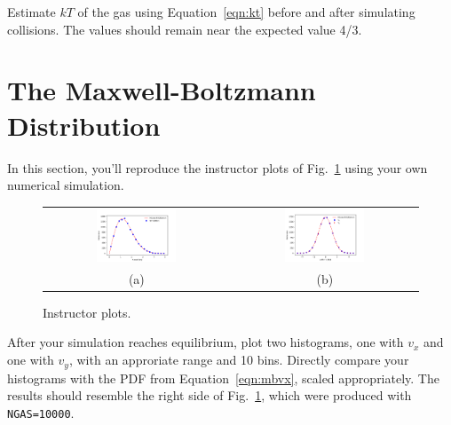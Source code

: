 {\plot Estimate $kT$ of the gas using Equation~\ref{eqn:kt} before and after simulating collisions.
The values should remain near the expected value 4/3.


\section{The Maxwell-Boltzmann Distribution}
\label{sec:mbdist}


In this section, you'll reproduce the instructor plots of
Fig.~\ref{fig:mbinst} using your own numerical simulation.\\

\begin{figure}[htbp]
\begin{center}
  \begin{tabular}{cc}   
  \includegraphics[width=0.45\textwidth]{figs/maxwellboltzman/mbinstv.pdf} &
  \includegraphics[width=0.45\textwidth]{figs/maxwellboltzman/mbinstvxvy.pdf} \\
  (a) & (b) \\
  \end{tabular}
\caption{Instructor plots.}
\label{fig:mbinst}
\end{center}
\end{figure}

\plot After your simulation reaches equilibrium, plot two histograms,
one with $v_x$ and one with $v_y$, with an approriate range and 10
bins.  Directly compare your histograms with the PDF from
Equation~\ref{eqn:mbvx}, scaled appropriately.  The results should
resemble the right side of Fig.~\ref{fig:mbinst}, which were produced
with {\tt NGAS=10000}.\\

}
